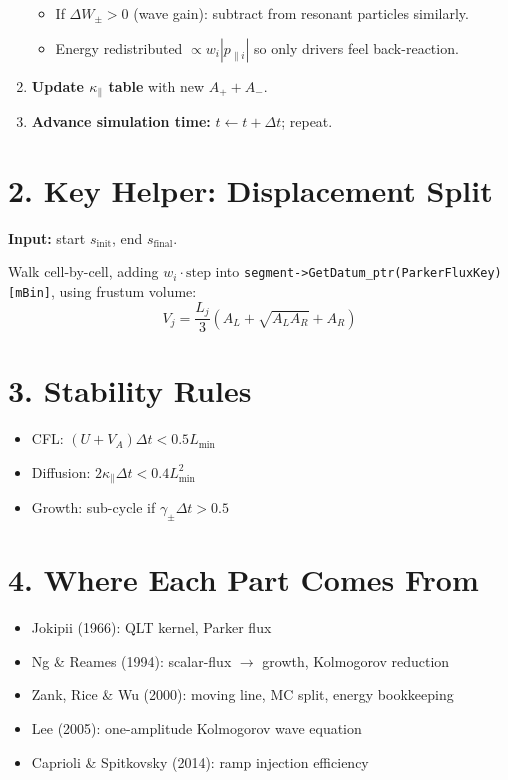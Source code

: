 \begin{enumerate}[label=\arabic*.]
\begin{itemize}
\item If $\Delta W_\pm > 0$ (wave gain): subtract from resonant particles similarly.

\item Energy redistributed $\propto w_i |p_{\parallel i}|$ so only drivers feel back-reaction.
\end{itemize}

\item \textbf{Update $\kappa_\parallel$ table} with new $A_+ + A_-$.

\item \textbf{Advance simulation time:} $t \leftarrow t + \Delta t$; repeat.
\end{enumerate}

\section*{2. Key Helper: Displacement Split}

\textbf{Input:} start $s_{\text{init}}$, end $s_{\text{final}}$.

Walk cell-by-cell, adding $w_i \cdot \text{step}$ into
\texttt{segment->GetDatum\_ptr(ParkerFluxKey)[mBin]}, using frustum volume:
\[
V_j = \frac{L_j}{3}(A_L + \sqrt{A_L A_R} + A_R)
\]

\section*{3. Stability Rules}
\begin{itemize}
\item CFL: $(U + V_A)\Delta t < 0.5 L_{\min}$
\item Diffusion: $2\kappa_\parallel \Delta t < 0.4 L_{\min}^2$
\item Growth: sub-cycle if $\gamma_\pm \Delta t > 0.5$
\end{itemize}

\section*{4. Where Each Part Comes From}
\begin{itemize}
\item Jokipii (1966): QLT kernel, Parker flux
\item Ng \& Reames (1994): scalar-flux $\rightarrow$ growth, Kolmogorov reduction
\item Zank, Rice \& Wu (2000): moving line, MC split, energy bookkeeping
\item Lee (2005): one-amplitude Kolmogorov wave equation
\item Caprioli \& Spitkovsky (2014): ramp injection efficiency
\end{itemize}

